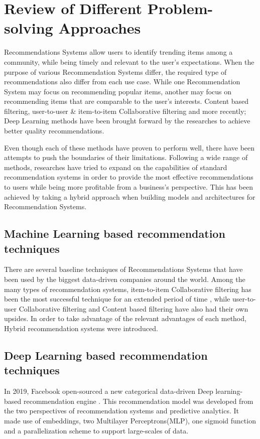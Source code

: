 \section{Review of Different Problem-solving Approaches}

Recommendations Systems allow users to identify trending items among a community, while being timely and relevant to the user's expectations. When the purpose of various Recommendation Systems differ, the required type of recommendations also differ from each use case. While one Recommendation System may focus on recommending popular items, another may focus on recommending items that are comparable to the user's interests. Content based filtering, user-to-user \& item-to-item Collaborative filtering and more recently; Deep Learning methods have been brought forward by the researches to achieve better quality recommendations.

Even though each of these methods have proven to perform well, there have been attempts to push the boundaries of their limitations. Following a wide range of methods, researches have tried to expand on the capabilities of standard recommendation systems in order to provide the most effective recommendations to users while being more profitable from a business's perspective. This has been achieved by taking a hybrid approach when building models and architectures for Recommendation Systems.

\subsection{Machine Learning based recommendation techniques}
There are several baseline techniques of Recommendations Systems that have been used by the biggest data-driven companies around the world.
Among the many types of recommendation systems, item-to-item Collaborative filtering \autocite{linden_amazoncom_2003} has been the most successful technique for an extended period of time \autocite{smith_two_2017}, while user-to-user Collaborative filtering and Content based filtering have also had their own upsides. In order to take advantage of the relevant advantages of each method, Hybrid recommendation systems were introduced. 

\subsection{Deep Learning based recommendation techniques}
In 2019, Facebook open-sourced a new categorical data-driven Deep learning-based recommendation engine \autocite{naumov_deep_2019, noauthor_we_2019}. This recommendation model was developed from the two perspectives of recommendation systems and predictive analytics. It made use of embeddings, two Multilayer Perceptrons(MLP), one sigmoid function \autocite{freudenthaler_factorization_2011} and a parallelization scheme to support large-scales of data.

